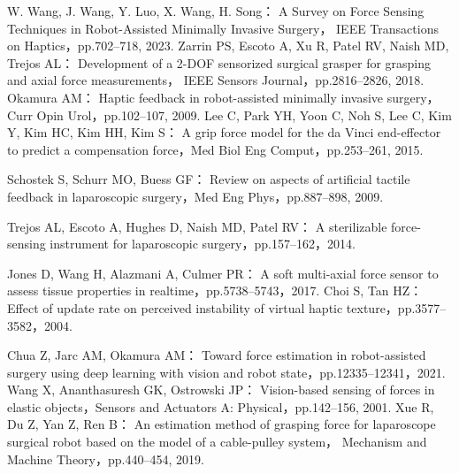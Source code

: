 \documentclass[a4paper]{jarticle}
\begin{document}
\begin{thebibliography}{9}
    \setlength{\itemsep}{0pt} %
    \renewcommand{\baselinestretch}{0.8}\selectfont %
    \setlength{\parskip}{0pt} %

    W. Wang, J. Wang, Y. Luo, X. Wang, H. Song：
    A Survey on Force Sensing Techniques in Robot-Assisted Minimally Invasive Surgery，
    IEEE Transactions on Haptics，pp.702–718, 2023.
    Zarrin PS, Escoto A, Xu R, Patel RV, Naish MD, Trejos AL： 
    Development of a 2-DOF sensorized surgical grasper for grasping and axial force measurements，
    IEEE Sensors Journal，pp.2816–2826, 2018.
    Okamura AM：
    Haptic feedback in robot-assisted minimally invasive surgery，Curr Opin Urol，pp.102–107, 2009.
    Lee C, Park YH, Yoon C, Noh S, Lee C, Kim Y, Kim HC, Kim HH, Kim S：
    A grip force model for the da Vinci end-effector to predict a compensation force，Med Biol Eng Comput，pp.253–261, 2015.

    Schostek S, Schurr MO, Buess GF：
    Review on aspects of artificial tactile feedback in laparoscopic surgery，Med Eng Phys，pp.887–898, 2009.

    Trejos AL, Escoto A, Hughes D, Naish MD, Patel RV：
    A sterilizable force-sensing instrument for laparoscopic surgery，pp.157–162，2014.

    Jones D, Wang H, Alazmani A, Culmer PR：
    A soft multi-axial force sensor to assess tissue properties in realtime，pp.5738–5743，2017.
    Choi S, Tan HZ：
    Effect of update rate on perceived instability of virtual haptic texture，pp.3577–3582，2004.

    Chua Z, Jarc AM, Okamura AM：
    Toward force estimation in robot-assisted surgery using deep learning with vision and robot state，pp.12335–12341，2021.
    Wang X, Ananthasuresh GK, Ostrowski JP：
    Vision-based sensing of forces in elastic objects，Sensors and Actuators A: Physical，pp.142–156, 2001.
    Xue R, Du Z, Yan Z, Ren B：
    An estimation method of grasping force for laparoscope surgical robot based on the model of a cable-pulley system，
    Mechanism and Machine Theory，pp.440–454, 2019.


\end{thebibliography}
\end{document}
